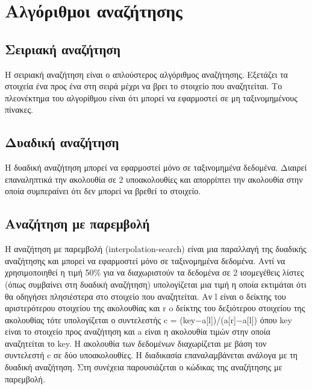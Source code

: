



\section{Αλγόριθμοι αναζήτησης}

\subsection{Σειριακή αναζήτηση}
Η σειριακή αναζήτηση είναι ο απλούστερος αλγόριθμος αναζήτησης. Εξετάζει τα στοιχεία ένα προς ένα στη σειρά μέχρι να βρει το στοιχείο που αναζητείται. Το πλεονέκτημα του αλγορίθμου είναι ότι μπορεί να εφαρμοστεί σε μη ταξινομημένους πίνακες.





\subsection{Δυαδική αναζήτηση}
Η δυαδική αναζήτηση μπορεί να εφαρμοστεί μόνο σε ταξινομημένα δεδομένα. Διαιρεί επαναληπτικά την ακολουθία σε 2 υποακολουθίες και απορρίπτει την ακολουθία στην οποία συμπεραίνει ότι δεν μπορεί να βρεθεί το στοιχείο. 







\subsection{Αναζήτηση με παρεμβολή}
Η αναζήτηση με παρεμβολή (interpolation-search) είναι μια παραλλαγή της δυαδικής αναζήτησης και μπορεί να εφαρμοστεί μόνο σε ταξινομημένα δεδομένα. Αντί να χρησιμοποιηθεί η τιμή 50\% για να διαχωριστούν τα δεδομένα σε 2 ισομεγέθεις λίστες (όπως συμβαίνει στη δυαδική αναζήτηση) υπολογίζεται μια τιμή η οποία εκτιμάται ότι θα οδηγήσει πλησιέστερα στο στοιχείο που αναζητείται. Αν l είναι ο δείκτης του αριστερότερου στοιχείου της ακολουθίας και r o δείκτης του δεξιότερου στοιχείου της ακολουθίας τότε υπολογίζεται ο συντελεστής 
c = (key−a[l])/(a[r]−a[l]) όπου key είναι το στοιχείο προς αναζήτηση και a είναι η ακολουθία τιμών στην οποία αναζητείται το key. Η ακολουθία των δεδομένων διαχωρίζεται με βάση τον συντελεστή c σε δύο υποακολουθίες. Η διαδικασία επαναλαμβάνεται ανάλογα με τη δυαδική αναζήτηση. Στη συνέχεια παρουσιάζεται ο κώδικας της αναζήτησης με παρεμβολή.

